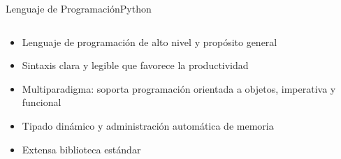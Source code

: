 \begin{frame}{Lenguaje de Programación}{Python}
\begin{columns}
\begin{column}{0.6\textwidth}
            \begin{itemize}
                \item Lenguaje de programación de alto nivel y propósito general
                \item Sintaxis clara y legible que favorece la productividad
                \item Multiparadigma: soporta programación orientada a objetos, imperativa y funcional
                \item Tipado dinámico y administración automática de memoria
                \item Extensa biblioteca estándar
            \end{itemize}
        \end{column}
    \end{columns}
\end{frame}

